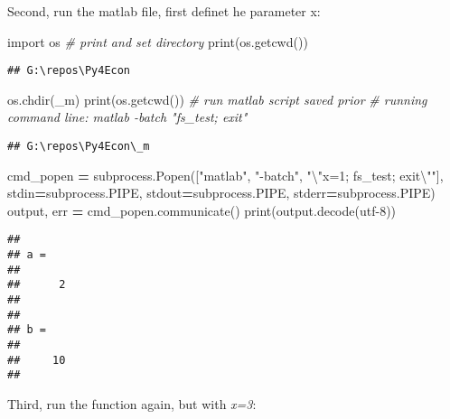 \documentclass[
]{book}
\newenvironment{Shaded}{\begin{snugshade}}{\end{snugshade}}
\newcommand{\BuiltInTok}[1]{#1}
\newcommand{\CharTok}[1]{\textcolor[rgb]{0.31,0.60,0.02}{#1}}
\newcommand{\CommentTok}[1]{\textcolor[rgb]{0.56,0.35,0.01}{\textit{#1}}}
\newcommand{\ImportTok}[1]{#1}
\newcommand{\NormalTok}[1]{#1}
\newcommand{\OperatorTok}[1]{\textcolor[rgb]{0.81,0.36,0.00}{\textbf{#1}}}
\newcommand{\StringTok}[1]{\textcolor[rgb]{0.31,0.60,0.02}{#1}}
\begin{document}
Second, run the matlab file, first definet he parameter x:

\begin{Shaded}
\begin{Highlighting}[]
\ImportTok{import}\NormalTok{ os}
\CommentTok{\# print and set directory}
\BuiltInTok{print}\NormalTok{(os.getcwd())}
\end{Highlighting}
\end{Shaded}

\begin{verbatim}
## G:\repos\Py4Econ
\end{verbatim}

\begin{Shaded}
\begin{Highlighting}[]
\NormalTok{os.chdir(}\StringTok{\textquotesingle{}\_m\textquotesingle{}}\NormalTok{)}
\BuiltInTok{print}\NormalTok{(os.getcwd())}
\CommentTok{\# run matlab script saved prior}
\CommentTok{\# running command line: matlab {-}batch "fs\_test; exit"}
\end{Highlighting}
\end{Shaded}

\begin{verbatim}
## G:\repos\Py4Econ\_m
\end{verbatim}

\begin{Shaded}
\begin{Highlighting}[]
\NormalTok{cmd\_popen }\OperatorTok{=}\NormalTok{ subprocess.Popen([}\StringTok{"matlab"}\NormalTok{, }\StringTok{"{-}batch"}\NormalTok{, }\StringTok{"}\CharTok{\textbackslash{}"}\StringTok{x=1; fs\_test; exit}\CharTok{\textbackslash{}"}\StringTok{"}\NormalTok{],}
\NormalTok{                             stdin}\OperatorTok{=}\NormalTok{subprocess.PIPE,}
\NormalTok{                             stdout}\OperatorTok{=}\NormalTok{subprocess.PIPE,}
\NormalTok{                             stderr}\OperatorTok{=}\NormalTok{subprocess.PIPE)}
\NormalTok{output, err }\OperatorTok{=}\NormalTok{ cmd\_popen.communicate()}
\BuiltInTok{print}\NormalTok{(output.decode(}\StringTok{\textquotesingle{}utf{-}8\textquotesingle{}}\NormalTok{))}
\end{Highlighting}
\end{Shaded}

\begin{verbatim}
## 
## a =
## 
##      2
## 
## 
## b =
## 
##     10
## 
\end{verbatim}

Third, run the function again, but with \emph{x=3}:
\end{document}

